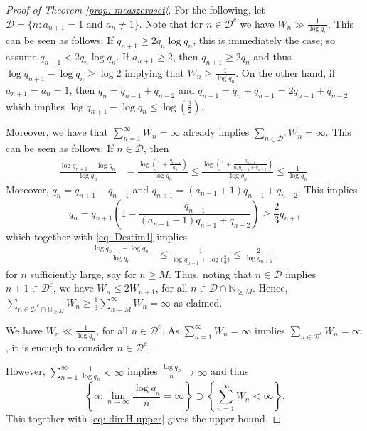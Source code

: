 \documentclass[11pt]{amsart}
\theoremstyle{definition}
\numberwithin{equation}{section}
\begin{document}
\begin{proof}[Proof of Theorem \ref{prop: measzeroset}]
For the following, let $\mathcal{D}=\{n: a_{n+1}= 1\text{ and }a_n\neq 1\}$. Note that for $n\in \mathcal{D}^c$ we have $W_n\gg \frac{1}{\log q_n}$. This can be seen as follows: If $q_{n+1}\geq 2q_n\log q_n$, this is immediately the case; so assume $q_{n+1}< 2q_n\log q_n$.
If $a_{n+1}\geq 2$, then $q_{n+1}\geq 2 q_{n}$ and thus $\log q_{n+1}-\log q_n\geq \log 2$ implying that $W_n\geq \frac{1}{\log q_n}$. 
On the other hand, if $a_{n+1}=a_n=1$, then $q_n=q_{n-1}+q_{n-2}$ and
$q_{n+1}=q_n+q_{n-1}=2q_{n-1}+q_{n-2}$ which implies $\log q_{n+1}-\log q_n\leq \log (\frac{3}{2})$.


Moreover, we have that $\sum_{n=1}^{\infty} W_n=\infty$ already implies $\sum_{n\in\mathcal{D}^c}W_n=\infty$. This can be seen as follows: If $n\in\mathcal{D}$, then 
\begin{align}
 \frac{\log q_{n+1}-\log q_n}{\log q_n}
 &= \frac{\log \left(1+\frac{q_{n-1}}{q_n}\right)}{\log q_n}
 \leq \frac{\log \left(1+\frac{q_{n-1}}{a_nq_{n-1}+q_{n-2}}\right)}{\log q_n}\leq \frac{1}{\log q_n}.\label{eq: Destim1}
\end{align}
Moreover, $q_n=q_{n+1}-q_{n-1}$ and $q_{n+1}=(a_{n-1}+1)q_{n-1}+q_{n-2}$. This implies 
$$q_n=q_{n+1}\left(1-\frac{q_{n-1}}{(a_{n-1}+1)q_{n-1}+q_{n-2}}\right)\geq \frac{2}{3}q_{n+1}$$
which together with \eqref{eq: Destim1} implies 
\begin{align*}
 \frac{\log q_{n+1}-\log q_n}{\log q_n}
 &\leq \frac{1}{\log q_{n+1}+\log \big( \frac{2}{3}\big)}\leq \frac{2}{\log q_{n+1}}, 
\end{align*}
for $n$ sufficiently large, say for $n\geq M$. Thus, noting that 
$n\in\mathcal{D}$ implies $n+1\in\mathcal{D}^c$, we have $W_n\leq 2W_{n+1}$, for all $n\in \mathcal{D}\cap\mathbb{N}_{\geq M}$. 
Hence, $\sum_{n\in\mathcal{D}^c\cap\mathbb{N}_{\geq M}}W_n\geq \frac{1}{3}\sum_{n=M}^{\infty} W_n=\infty$ as claimed.  







We have $W_n\ll \frac{1}{\log q_n}$, for all $n\in \mathcal{D}^c$. As $\sum_{n=1}^{\infty}W_n=\infty$ implies $\sum_{n\in \mathcal{D}^c} W_n=\infty$, it is enough to consider $n\in \mathcal{D}^c$. 

However, 
$\sum_{n=1}^{\infty}\frac{1}{\log q_n}<\infty$ implies $\frac{\log q_n}{n}\to\infty$ and thus
$$\left\{\alpha: \lim_{n\to\infty}\frac{\log q_n}{n}=\infty\right\}\supset \left\{\sum_{n=1}^{\infty} W_n<\infty\right\}.$$ This together with \eqref{eq: dimH upper} gives the upper bound.
\end{proof}
\end{document}
